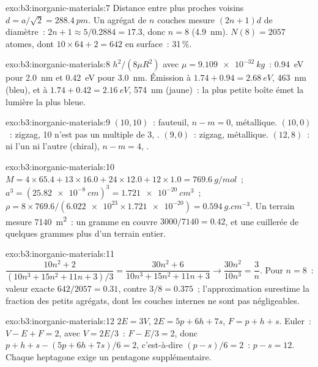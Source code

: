 \begin{solution}{exo:b3:inorganic-materials:7}
Distance entre plus proches voisins $d = a/\sqrt2 = \qty{288.4}{pm}$. Un agrégat de $n$ couches mesure $(2n + 1)d$ de diamètre~:
$2n + 1 \approx 5/0.2884 = 17.3$, donc $n = 8$ (\qty{4.9}{nm}). $N(8) = 2057$ atomes, dont $10 \times 64 + 2 = 642$ en surface~:
31\,\%.
\end{solution}

\begin{solution}{exo:b3:inorganic-materials:8}
$h^2/(8\mu R^2)$ avec $\mu = \qty{9.109e-32}{kg}$~: \qty{0.94}{eV} pour \qty{2.0}{nm} et \qty{0.42}{eV} pour \qty{3.0}{nm}. Émission à
$1.74 + 0.94 = \qty{2.68}{eV}$, \qty{463}{nm} (bleu), et à $1.74 + 0.42 = \qty{2.16}{eV}$, \qty{574}{nm} (jaune)~: la plus petite
boîte émet la lumière la plus bleue.
\end{solution}

\begin{solution}{exo:b3:inorganic-materials:9}
$(10, 10)$~: fauteuil, $n - m = 0$, métallique. $(10, 0)$~: zigzag, 10 n'est pas un multiple de 3, .
$(9, 0)$~: zigzag, métallique. $(12, 8)$~: ni l'un ni l'autre (chiral), $n - m = 4$, .
\end{solution}

\begin{solution}{exo:b3:inorganic-materials:10}
$M = 4 \times 65.4 + 13 \times 16.0 + 24 \times 12.0 + 12 \times 1.0 = \qty{769.6}{g/mol}$~; $a^3 = (\qty{25.82e-8}{cm})^3 = \qty{1.721e-20}{cm^3}$~;
$\rho = 8 \times 769.6/(\num{6.022e23} \times \num{1.721e-20}) = \qty{0.594}{g.cm^{-3}}$. Un terrain mesure \qty{7140}{m^2}~: un gramme en couvre
$3000/7140 = 0.42$, et une cuillerée de quelques grammes plus d'un terrain
entier.
\end{solution}

\begin{solution}{exo:b3:inorganic-materials:11}
$\dfrac{10n^2 + 2}{(10n^3 + 15n^2 + 11n + 3)/3} = \dfrac{30n^2 + 6}{10n^3 + 15n^2 + 11n + 3} \to \dfrac{30n^2}{10n^3} = \dfrac3n$. Pour $n = 8$~: valeur exacte
$642/2057 = 0.31$, contre $3/8 = 0.375$~; l'approximation surestime la fraction des petits
agrégats, dont les couches internes ne sont pas négligeables.
\end{solution}

\begin{solution}{exo:b3:inorganic-materials:12}
$2E = 3V$, $2E = 5p + 6h + 7s$, $F = p + h + s$. Euler~: $V - E + F = 2$, avec $V = 2E/3$~: $F - E/3 = 2$, donc
$p + h + s - (5p + 6h + 7s)/6 = 2$, c'est-à-dire $(p - s)/6 = 2$~: $p - s = 12$. Chaque heptagone exige
un pentagone supplémentaire.
\end{solution}

